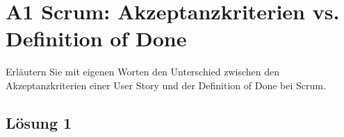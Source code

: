 \documentclass[main.tex]{subfiles}
\begin{document}
\section{A1 Scrum: Akzeptanzkriterien vs. Definition of Done}
Erläutern Sie mit eigenen Worten den Unterschied zwischen den Akzeptanzkriterien einer User
Story und der Definition of Done bei Scrum.

\subsection{Lösung 1}
\end{document}
